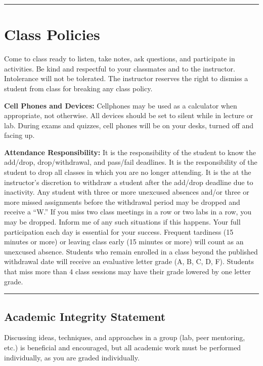 \documentclass[12pt]{article}
\begin{document}
\medskip
\hrule

\section*{Class Policies}
Come to class ready to listen, take notes, ask questions, and participate in activities. 
Be kind and respectful to your classmates and to the instructor.
Intolerance will not be tolerated.
The instructor reserves the right to dismiss a student from class for breaking any class policy.

\medskip
\noindent
\textbf{Cell Phones and Devices:} 
Cellphones may be used as a calculator when appropriate, not otherwise. 
All devices should be set to silent while in lecture or lab.
During exams and quizzes, cell phones will be on your desks, turned off and facing up.

\medskip
\noindent
\textbf{Attendance Responsibility:} 
It is the responsibility of the student to know the add/drop, drop/withdrawal, and pass/fail deadlines.
It is the responsibility of the student to drop all classes in which you are no longer attending. 
It is the at the instructor’s discretion to withdraw a student after the add/drop deadline due to inactivity. 
Any student with three or more unexcused absences and/or three or more missed assignments before the withdrawal period may be dropped and receive a ``W.'' 
If you miss two class meetings in a row or two labs in a row, you may be dropped. 
Inform me of any such situations if this happens. 
Your full participation each day is essential for your success. 
Frequent tardiness (15 minutes or more) or leaving class early (15 minutes or more) will count as an unexcused absence. 
Students who remain enrolled in a class beyond the published withdrawal date will receive an evaluative letter grade (A, B, C, D, F). 
Students that miss more than 4 class sessions may have their grade lowered by one letter grade.

\medskip
\hrule

\subsection*{Academic Integrity Statement}
Discussing ideas, techniques, and approaches in a group (lab, peer mentoring, etc.) is beneficial and encouraged, but all academic work must be performed individually, as you are graded individually.
\end{document}
